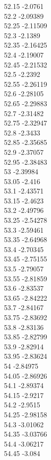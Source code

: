{52.15	-2.0761\\
52.2	-2.09389\\
52.25	-2.11509\\
52.3	-2.1389\\
52.35	-2.16425\\
52.4	-2.19007\\
52.45	-2.21532\\
52.5	-2.2392\\
52.55	-2.26119\\
52.6	-2.28105\\
52.65	-2.29883\\
52.7	-2.31482\\
52.75	-2.32947\\
52.8	-2.3433\\
52.85	-2.35685\\
52.9	-2.37057\\
52.95	-2.38483\\
53	-2.39984\\
53.05	-2.416\\
53.1	-2.43571\\
53.15	-2.4623\\
53.2	-2.49796\\
53.25	-2.54278\\
53.3	-2.59461\\
53.35	-2.64968\\
53.4	-2.70345\\
53.45	-2.75155\\
53.5	-2.79057\\
53.55	-2.81859\\
53.6	-2.83537\\
53.65	-2.84222\\
53.7	-2.84167\\
53.75	-2.83692\\
53.8	-2.83136\\
53.85	-2.82799\\
53.9	-2.82914\\
53.95	-2.83624\\
54	-2.84975\\
54.05	-2.86926\\
54.1	-2.89374\\
54.15	-2.9217\\
54.2	-2.9515\\
54.25	-2.98158\\
54.3	-3.01062\\
54.35	-3.03766\\
54.4	-3.06217\\
54.45	-3.084\\
}
